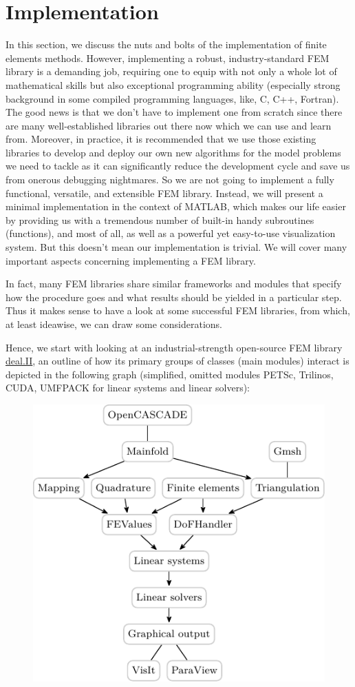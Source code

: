 	\section{Implementation}\label{section.4}
	In this section, we discuss the nuts and bolts of the implementation of
	finite elements methods. However, implementing a robust, 
	industry-standard FEM library is a demanding job, requiring one to
	equip with not only a whole lot of mathematical skills but also 
	exceptional programming ability (especially strong background in 
	some compiled programming languages, like, C, C++, Fortran).
	The good news is that we don't have to implement one from scratch since 
	there are many well-established libraries out there now	which we can use 
	and learn from. Moreover, in practice, it is recommended that we use those 
	existing libraries to develop and deploy our own new algorithms for the 
	model problems we need to tackle as it can significantly reduce the 
	development cycle and save us from onerous debugging nightmares. So we are
	not going to implement a fully functional, versatile, and extensible FEM
	library. Instead, we will present a minimal implementation in the context
	of MATLAB, which makes our life easier by providing us with a tremendous
	number of built-in handy subroutines (functions), and most of all, as well
	as a powerful yet easy-to-use visualization system. But this doesn't mean 
	our implementation is trivial. We will cover many important aspects 
	concerning implementing a FEM library.
	
	In fact, many FEM libraries share similar frameworks and modules that 
	specify how the procedure goes and what results should be yielded in a 
	particular step.  Thus it makes sense to have a look at some successful
	FEM libraries, from which, at least ideawise, we can draw some 
	considerations.
			
	Hence, we start with looking at an industrial-strength
	open-source FEM library \href{https://dealii.org}{deal.II}, an outline of 
	how its primary groups of classes (main modules) interact is depicted in
	the following graph (simplified, omitted modules 
	PETSc, Trilinos, CUDA, UMFPACK for linear systems and linear 
	solvers): \vspace{-5pt}
	\begin{figure}[htbp!]
		\centering
		\includegraphics[width=0.6\linewidth]{svg/dealii_outline}
		\label{deal.ii outline}
	\end{figure}

